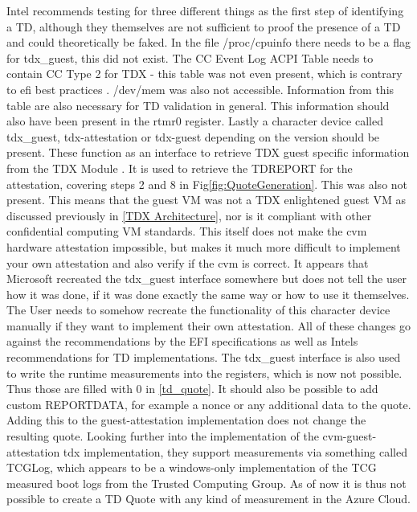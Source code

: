\label{Issues-with-azure-td}
Intel recommends testing for three different things as the first step of identifying a TD, although they themselves are not sufficient to proof the presence of a TD and could theoretically be faked. In the file /proc/cpuinfo there needs to be a flag for tdx\_guest, this did not exist. The CC Event Log ACPI Table needs to contain CC Type 2 for TDX - this table was not even present, which is contrary to efi best practices \cite{uefi_forum_inc_acpi_docu_2022}. /dev/mem was also not accessible. Information from this table are also necessary for TD validation in general. This information should also have been present in the rtmr0 register. Lastly a character device called tdx\_guest, tdx-attestation or tdx-guest depending on the version should be present. These function as an interface to retrieve TDX guest specific information from the TDX Module \cite{linux_kernel_development_community_tdx_2024}. It is used to retrieve the TDREPORT for the attestation, covering steps 2 and 8 in Fig\ref{fig:QuoteGeneration}. This was also not present. This means that the guest VM was not a TDX enlightened guest VM as discussed previously in \cref{TDX Architecture}, nor is it compliant with other confidential computing VM standards. This itself does not make the cvm hardware attestation impossible, but makes it much more difficult to implement your own attestation and also verify if the cvm is correct. It appears that Microsoft recreated the tdx\_guest interface somewhere but does not tell the user how it was done, if it was done exactly the same way or how to use it themselves. The User needs to somehow recreate the functionality of this character device manually if they want to implement their own attestation. All of these changes go against the recommendations by the EFI specifications as well as Intels recommendations for TD implementations.
The tdx\_guest interface is also used to write the runtime measurements into the registers, which is now not possible. Thus those are filled with 0 in \cref{td_quote}. It should also be possible to add custom REPORTDATA, for example a nonce or any additional data to the quote. Adding this to the guest-attestation implementation does not change the resulting quote.
Looking further into the implementation of the cvm-guest-attestation tdx implementation, they support measurements via something called TCGLog, which appears to be a windows-only implementation of the \guillemotright TCG measured boot logs \guillemotleft \cite{graeber_mattifestationtcglogtools_2023} from the Trusted Computing Group. As of now it is thus not possible to create a TD Quote with any kind of measurement in the Azure Cloud. 
